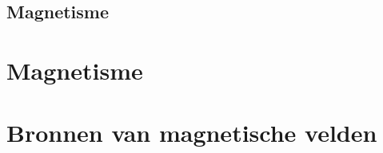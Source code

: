\documentclass{exam}
\begin{document}
\vspace{0.5cm}



\newpage

\vspace*{\fill}
\begin{center}
    
\section*{Magnetisme}
\end{center}

\vspace*{\fill}

\newpage

\section{Magnetisme}


\newpage

\section{Bronnen van magnetische velden}

\end{document}
